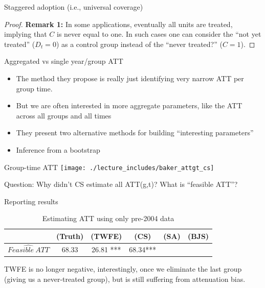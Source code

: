 \documentclass{beamer}
\begin{document}
\begin{frame}{Staggered adoption (i.e., universal coverage)}


\begin{proof}{\textbf{Remark 1:}}
In some applications, eventually all units are treated, implying that $C$ is never equal to one. In such cases one can consider the ``not yet treated'' ($D_t = 0$) as a control group instead of
the ``never treated?'' ($C = 1$).
\end{proof}

\end{frame}

\begin{frame}{Aggregated vs single year/group ATT}

\begin{itemize}
\item The method they propose is really just identifying very narrow ATT per group time.
\item But we are often interested in  more aggregate parameters, like the ATT across all groups and all times
\item They present two alternative methods for building ``interesting parameters'' 
\item Inference from a bootstrap
\end{itemize}


\end{frame}



\begin{frame}{Group-time ATT }
             \texttt{[image: ./lecture\_includes/baker\_attgt\_cs]}

Question: Why didn't CS estimate all ATT(g,t)? What is ``feasible ATT''?

\end{frame}

\begin{frame}{Reporting results}
\begin{table}[htbp]\centering
\small
\caption{Estimating ATT using only pre-2004 data}
\begin{center}
\begin{tabular}{l*{5}{c}}
\hline
\multicolumn{1}{l}{\textbf{}}&
\multicolumn{1}{c}{\textbf{(Truth)}}&
\multicolumn{1}{c}{\textbf{(TWFE)}}&
\multicolumn{1}{c}{\textbf{(CS)}}&
\multicolumn{1}{c}{\textbf{(SA)}}&
\multicolumn{1}{c}{\textbf{(BJS)}}\\
\hline
$\widehat{Feasible\ ATT}$  & 68.33    & 26.81 *** & 68.34*** &&\\
\hline
\end{tabular}
\end{center}
\end{table}

TWFE is no longer negative, interestingly, once we eliminate the last group (giving us a never-treated group), but is still suffering from attenuation bias. 

\end{frame}
\end{document}
